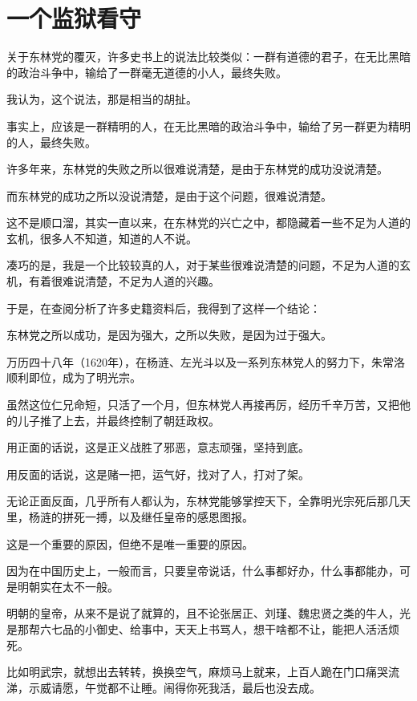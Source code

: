 \section{一个监狱看守}
\ifnum{}
	\begin{multicols}{\theparacolNo}
		\fi
		关于东林党的覆灭，许多史书上的说法比较类似：一群有道德的君子，在无比黑暗的政治斗争中，输给了一群毫无道德的小人，最终失败。

		我认为，这个说法，那是相当的胡扯。

		事实上，应该是一群精明的人，在无比黑暗的政治斗争中，输给了另一群更为精明的人，最终失败。

		许多年来，东林党的失败之所以很难说清楚，是由于东林党的成功没说清楚。

		而东林党的成功之所以没说清楚，是由于这个问题，很难说清楚。

		这不是顺口溜，其实一直以来，在东林党的兴亡之中，都隐藏着一些不足为人道的玄机，很多人不知道，知道的人不说。

		凑巧的是，我是一个比较较真的人，对于某些很难说清楚的问题，不足为人道的玄机，有着很难说清楚，不足为人道的兴趣。

		于是，在查阅分析了许多史籍资料后，我得到了这样一个结论：

		东林党之所以成功，是因为强大，之所以失败，是因为过于强大。

		万历四十八年（1620年），在杨涟、左光斗以及一系列东林党人的努力下，朱常洛顺利即位，成为了明光宗。

		虽然这位仁兄命短，只活了一个月，但东林党人再接再厉，经历千辛万苦，又把他的儿子推了上去，并最终控制了朝廷政权。

		用正面的话说，这是正义战胜了邪恶，意志顽强，坚持到底。

		用反面的话说，这是赌一把，运气好，找对了人，打对了架。

		无论正面反面，几乎所有人都认为，东林党能够掌控天下，全靠明光宗死后那几天里，杨涟的拼死一搏，以及继任皇帝的感恩图报。

		这是一个重要的原因，但绝不是唯一重要的原因。

		因为在中国历史上，一般而言，只要皇帝说话，什么事都好办，什么事都能办，可是明朝实在太不一般。

		明朝的皇帝，从来不是说了就算的，且不论张居正、刘瑾、魏忠贤之类的牛人，光是那帮六七品的小御史、给事中，天天上书骂人，想干啥都不让，能把人活活烦死。

		比如明武宗，就想出去转转，换换空气，麻烦马上就来，上百人跪在门口痛哭流涕，示威请愿，午觉都不让睡。闹得你死我活，最后也没去成。


\end{multicols}

